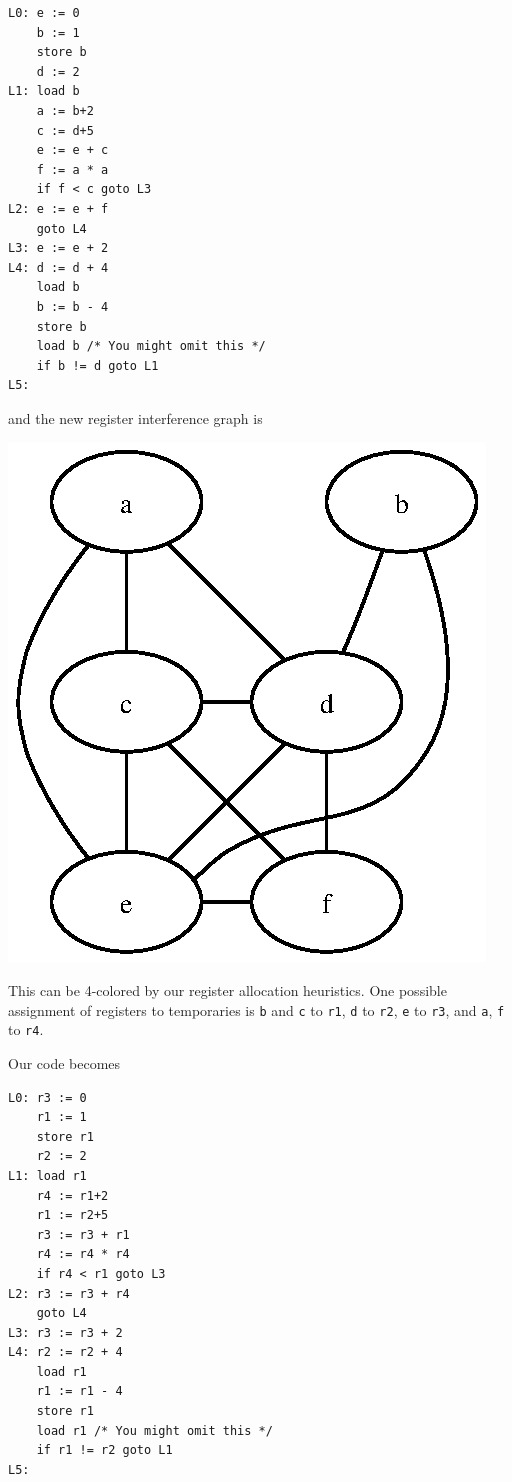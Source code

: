 \documentclass{article}
\begin{document}
\begin{enumerate}
\begin{enumerate}
\begin{verbatim}
L0: e := 0
    b := 1
    store b
    d := 2
L1: load b
    a := b+2
    c := d+5
    e := e + c
    f := a * a
    if f < c goto L3
L2: e := e + f
    goto L4
L3: e := e + 2
L4: d := d + 4
    load b
    b := b - 4
    store b
    load b /* You might omit this */
    if b != d goto L1
L5:
\end{verbatim}
and the new register interference graph is
\begin{center}
\includegraphics[angle=0]{wa10-s1c}
\end{center}
This can be 4-colored by our register allocation heuristics. 
One possible assignment of registers to
temporaries is \texttt{b} and \texttt{c} to \texttt{r1}, \texttt{d} to
\texttt{r2}, \texttt{e} to \texttt{r3}, and \texttt{a}, \texttt{f} to
\texttt{r4}.

Our code becomes
\begin{verbatim}
L0: r3 := 0
    r1 := 1
    store r1
    r2 := 2
L1: load r1
    r4 := r1+2
    r1 := r2+5
    r3 := r3 + r1
    r4 := r4 * r4
    if r4 < r1 goto L3
L2: r3 := r3 + r4
    goto L4
L3: r3 := r3 + 2
L4: r2 := r2 + 4
    load r1
    r1 := r1 - 4
    store r1
    load r1 /* You might omit this */
    if r1 != r2 goto L1
L5:
\end{verbatim}



\end{enumerate}
\end{enumerate}
\end{document}
